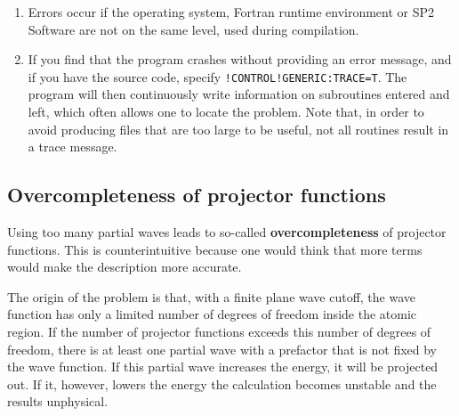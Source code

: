 \documentclass[final,12pt,makeidx,DIV=calc]{article}
\begin{document}
{{{\begin{enumerate}
  Library should give a useful message (affects only the parallel
  version).
\item Errors occur if the operating system, Fortran runtime
  environment or SP2 Software are not on the same level, 
  used during compilation.
\item If you find that the program crashes without providing an error
  message, and if you have the source code, specify
  \verb|!CONTROL!GENERIC:TRACE=T|. The program will then
  continuously write information on subroutines entered and left,
  which often allows one to locate the problem. Note that, in order to
  avoid producing files that are too large to be useful, not all routines
  result in a trace message.   %
\end{enumerate}


\subsection{Overcompleteness of projector functions}
Using too many partial waves leads to so-called
\textbf{overcompleteness} of projector
functions.  This is counterintuitive because one would think that more
terms would make the description more accurate. 

The origin of the problem is that, with a finite plane wave cutoff,
the wave function has only a limited number of degrees of freedom
inside the atomic region. If the number of projector functions
exceeds this number of degrees of freedom, there is at least one
partial wave with a prefactor that is not fixed by the wave function.
If this partial wave increases the energy, it will be projected
out. If it, however, lowers the energy the calculation becomes
unstable and the results unphysical.

}}}
\end{document}

